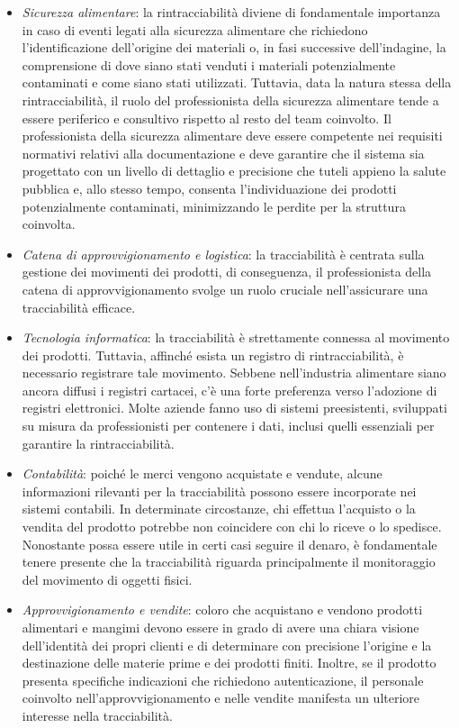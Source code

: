 \begin{itemize}
    \item \textit{Sicurezza alimentare}: la rintracciabilità diviene di fondamentale importanza in caso di eventi legati alla sicurezza alimentare che richiedono l'identificazione dell'origine dei materiali o, in fasi successive dell'indagine, la comprensione di dove siano stati venduti i materiali potenzialmente contaminati e come siano stati utilizzati. Tuttavia, data la natura stessa della rintracciabilità, il ruolo del professionista della sicurezza alimentare tende a essere periferico e consultivo rispetto al resto del team coinvolto. Il professionista della sicurezza alimentare deve essere competente nei requisiti normativi relativi alla documentazione e deve garantire che il sistema sia progettato con un livello di dettaglio e precisione che tuteli appieno la salute pubblica e, allo stesso tempo, consenta l'individuazione dei prodotti potenzialmente contaminati, minimizzando le perdite per la struttura coinvolta.
    \item \textit{Catena di approvvigionamento e logistica}: la tracciabilità è centrata sulla gestione dei movimenti dei prodotti, di conseguenza, il professionista della catena di approvvigionamento svolge un ruolo cruciale nell'assicurare una tracciabilità efficace.
    \item \textit{Tecnologia informatica}: la tracciabilità è strettamente connessa al movimento dei prodotti. Tuttavia, affinché esista un registro di rintracciabilità, è necessario registrare tale movimento. Sebbene nell'industria alimentare siano ancora diffusi i registri cartacei, c'è una forte preferenza verso l'adozione di registri elettronici. Molte aziende fanno uso di sistemi preesistenti, sviluppati su misura da professionisti per contenere i dati, inclusi quelli essenziali per garantire la rintracciabilità.
    \item \textit{Contabilità}: poiché le merci vengono acquistate e vendute, alcune informazioni rilevanti per la tracciabilità possono essere incorporate nei sistemi contabili. In determinate circostanze, chi effettua l'acquisto o la vendita del prodotto potrebbe non coincidere con chi lo riceve o lo spedisce. Nonostante possa essere utile in certi casi seguire il denaro, è fondamentale tenere presente che la tracciabilità riguarda principalmente il monitoraggio del movimento di oggetti fisici.
    \item \textit{Approvvigionamento e vendite}: coloro che acquistano e vendono prodotti alimentari e mangimi devono essere in grado di avere una chiara visione dell'identità dei propri clienti e di determinare con precisione l'origine e la destinazione delle materie prime e dei prodotti finiti. Inoltre, se il prodotto presenta specifiche indicazioni che richiedono autenticazione, il personale coinvolto nell'approvvigionamento e nelle vendite manifesta un ulteriore interesse nella tracciabilità.

\end{itemize}
